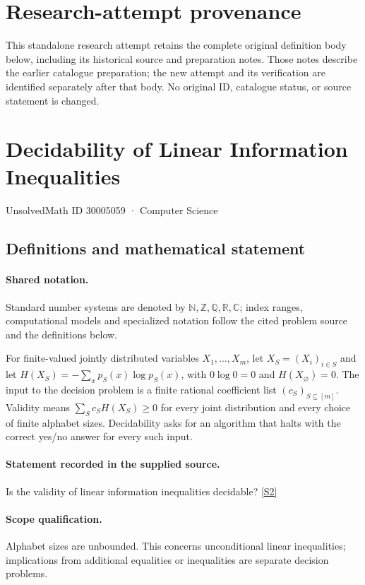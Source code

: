 \documentclass[11pt]{article}
\begin{document}
\section*{Research-attempt provenance}
This standalone research attempt retains the complete original definition body below,
including its historical source and preparation notes. Those notes describe the
earlier catalogue preparation; the new attempt and its verification are identified
separately after that body. No original ID, catalogue status, or source statement is changed.

\section{Decidability of Linear Information Inequalities}\label{30005059}
{\small UnsolvedMath ID 30005059 · Computer Science}
\subsection{Definitions and mathematical statement}

\paragraph{Shared notation.}Standard number systems are denoted by $\mathbb N,\mathbb Z,\mathbb Q,\mathbb R,\mathbb C$; index ranges, computational models and specialized notation follow the cited problem source and the definitions below.


For finite-valued jointly distributed variables $X_1,\ldots,X_m$, let $X_S=(X_i)_{i\in S}$ and let $H(X_S)=-\sum_x p_S(x)\log p_S(x)$, with $0\log0=0$ and $H(X_\varnothing)=0$. The input to the decision problem is a finite rational coefficient list $(c_S)_{S\subseteq[m]}$. Validity means $\sum_S c_SH(X_S)\geq0$ for every joint distribution and every choice of finite alphabet sizes. Decidability asks for an algorithm that halts with the correct yes/no answer for every such input.
\paragraph{Statement recorded in the supplied source.}
Is the validity of linear information inequalities decidable? \href{https://doi.org/10.4171/owr/2022/14}{[S2]}
\paragraph{Scope qualification.}
Alphabet sizes are unbounded. This concerns unconditional linear inequalities; implications from additional equalities or inequalities are separate decision problems.
\end{document}
